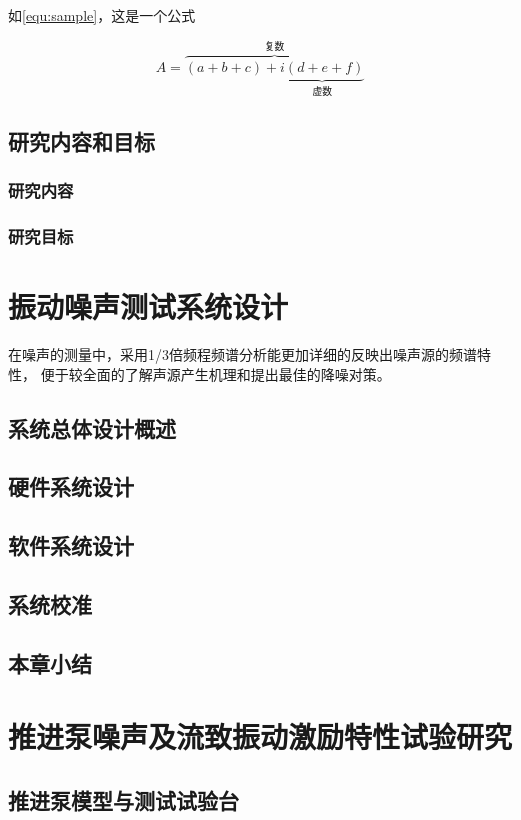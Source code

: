 \par 如\autoref{equ:sample}，这是一个公式

\begin{equation}
    \label{equ:sample}
    A=\overbrace{(a+b+c)+\underbrace{i(d+e+f)}_{\text{虚数}}}^{\text{复数}}
\end{equation}

\section{研究内容和目标}
\subsection{研究内容}
\subsection{研究目标}

\chapter{振动噪声测试系统设计}

在噪声的测量中，采用1/3倍频程频谱分析能更加详细的反映出噪声源的频谱特性，
便于较全面的了解声源产生机理和提出最佳的降噪对策。

\section{系统总体设计概述}
\section{硬件系统设计}
\section{软件系统设计}
\section{系统校准}
\section{本章小结}

\chapter{推进泵噪声及流致振动激励特性试验研究}
\section{推进泵模型与测试试验台}
